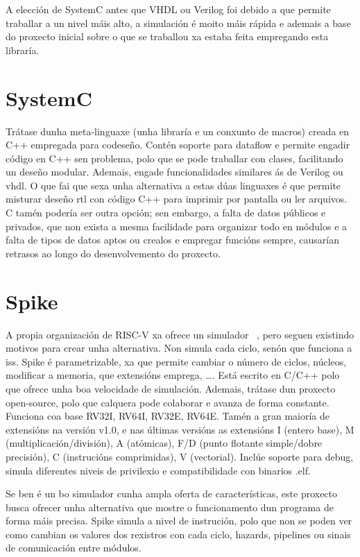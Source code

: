A elección de SystemC antes que VHDL ou Verilog foi debido a que permite traballar a un nivel máis alto, a simulación é moito máis rápida e ademais a base do proxecto inicial sobre o que se traballou xa estaba feita empregando esta libraría.

\section{SystemC}\label{sec:systemc}
Trátase dunha meta-linguaxe (unha libraría e un conxunto de macros) creada en C++ empregada para codeseño. Contén soporte para dataflow e permite engadir código en C++ sen problema, polo que se pode traballar con clases, facilitando un deseño modular. Ademais, engade funcionalidades similares ás de Verilog ou \acrshort{vhdl}. O que fai que sexa unha alternativa a estas dúas linguaxes é que permite misturar deseño \acrshort{rtl} con código C++ para imprimir por pantalla ou ler arquivos. C tamén podería ser outra opción; sen embargo, a falta de datos públicos e privados, que non exista a mesma facilidade para organizar todo en módulos e a falta de tipos de datos aptos ou crealos e empregar funcións sempre, causarían retrasos ao longo do desenvolvemento do proxecto.

\section{Spike}\label{sec:spike}
A propia organización de RISC-V xa ofrece un simulador ~\cite{sim_spike}, pero seguen existindo motivos para crear unha alternativa. Non simula cada ciclo, senón que funciona a \acrfull{iss}. Spike é parametrizable, xa que permite cambiar o número de ciclos, núcleos, modificar a memoria, que extensións emprega, \dots. Está escrito en C/C++ polo que ofrece unha boa velocidade de simulación. Ademais, trátase dun proxecto open-source, polo que calquera pode colaborar e  avanza de forma constante. Funciona coa base RV32I, RV64I, RV32E, RV64E. Tamén a gran maioría de extensións na versión v1.0, e nas últimas versións as extensións I (entero base), M (multiplicación/división), A (atómicas), F/D (punto flotante simple/dobre precisión), C (instrucións comprimidas), V (vectorial). Inclúe soporte para debug, simula diferentes niveis de privilexio e compatibilidade con binarios .elf. 

Se ben é un bo simulador cunha ampla oferta de características, este proxecto busca ofrecer unha alternativa que mostre o funcionamento dun programa de forma máis precisa. Spike simula a nivel de instrución, polo que non se poden ver como cambian os valores dos rexistros con cada ciclo, hazards, pipelines ou sinais de comunicación entre módulos.

